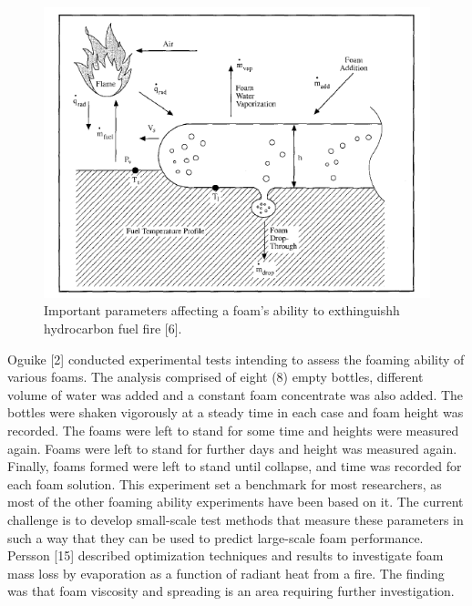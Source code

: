\documentclass[12pt]{report}
\begin{document}
\begin{figure}[H]
    \centering
    \includegraphics[width=\textwidth]{important_parameters.png}
    \caption{Important parameters affecting a foam's ability to exthinguishh hydrocarbon fuel fire [6].}
    \label{ch2:figure:parameters}
\end{figure}

Oguike [2] conducted experimental tests intending to assess the foaming ability of various foams. The analysis comprised of eight (8) empty bottles, different volume of water was added and a constant foam concentrate was also added. The bottles were shaken vigorously at a steady time in each case and foam height was recorded. The foams were left to stand for some time and heights were measured again. Foams were left to stand for further days and height was measured again. Finally, foams formed were left to stand until collapse, and time was recorded for each foam solution. This experiment set a benchmark for most researchers, as most of the other foaming ability experiments have been based on it.
The current challenge is to develop small-scale test methods that measure these parameters in such a way that they can be used to predict large-scale foam performance. Persson [15] described optimization techniques and results to investigate foam mass loss by evaporation as a function of radiant heat from a fire. The finding was that foam viscosity and spreading is an area requiring further investigation. 
\end{document}
